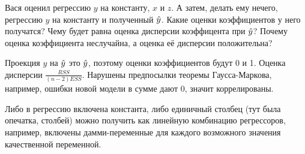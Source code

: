 \begin{problem}
Вася оценил регрессию $y$ на константу, $x$ и $z$. 
А затем, делать ему нечего, регрессию $y$ на константу и полученный $\hat{y}$. Какие оценки коэффициентов у него получатся? Чему будет равна оценка дисперсии коэффицента при $\hat{y}$? Почему оценка коэффициента неслучайна, а оценка её дисперсии положительна?


\begin{sol}
Проекция $y$ на $\hat{y}$ это $\hat{y}$, поэтому оценки коэффициентов будут 0 и 1. Оценка дисперсии $\frac{RSS}{(n-2)ESS}$. Нарушены предпосылки теоремы Гаусса-Маркова, например, ошибки новой модели в сумме дают 0, значит коррелированы.
\end{sol}
\end{problem}




\begin{problem}

\begin{sol}
Либо в регрессию включена константа, либо единичный столбец (тут была опечатка, столбей) можно получить как линейную комбинацию регрессоров, например, включены дамми-переменные для каждого возможного значения качественной переменной.
\end{sol}
\end{problem}


